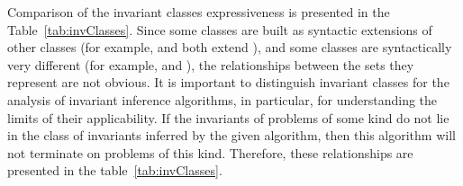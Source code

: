 \invariantreprclasses{\label{fig:Representations-new}}

Comparison of the invariant classes expressiveness is presented in the Table~\cref{tab:invClasses}.
Since some classes are built as syntactic extensions of other classes (for example, \syncRegFlatClass{} and \syncRegFullClass{} both extend \regclass{}), and some classes are syntactically very different (for example, \regclass{} and \elemclass{}), the relationships between the sets they represent are not obvious.
It is important to distinguish  invariant classes for the analysis of invariant inference algorithms, in particular, for understanding the limits of their applicability. If the invariants of problems of some kind do not lie in the class of invariants inferred by the given algorithm, then this algorithm will not terminate on problems of this kind. Therefore, these relationships are presented in the table~\ref{tab:invClasses}.

